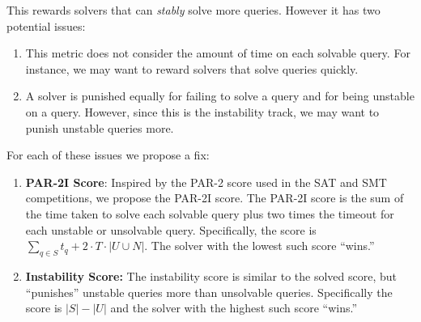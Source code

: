 \documentclass[
]{ceurart}
\begin{document}
\noindent This rewards solvers that can \emph{stably} solve more queries. However it has two potential issues:


\begin{enumerate}
  \item This metric does not consider the amount of time on each solvable query. For instance, we may want to reward solvers that solve queries quickly.
  \item A solver is punished equally for failing to solve a query and for being unstable on a query. However, since this is the instability track, we may want to punish unstable queries more.
\end{enumerate}

\noindent For each of these issues we propose a fix:

\begin{enumerate}[label=\Alph*.,start=2]
  \item \textbf{PAR-2I Score}: Inspired by the PAR-2 score used in the SAT and
  SMT competitions, we propose the PAR-2I score. The PAR-2I score is the sum of
  the time taken to solve each solvable query plus two times the timeout for
  each unstable or unsolvable query. Specifically, the score is $\sum_{q \in S}
  t_q + 2 \cdot T \cdot |U \cup N|$. The solver with the lowest such score ``wins.''
  \item \textbf{Instability Score:} The instability score is similar to the solved score, but  ``punishes'' unstable queries more than unsolvable queries. Specifically the score is $|S| - |U|$ and the solver with the highest such score ``wins.''
\end{enumerate}





\end{document}
